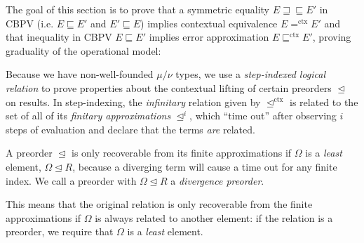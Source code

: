 \documentclass[acmsmall,screen,12pt]{acmart}
\newif\ifshort
\newcommand{\pipe}{\,\,|\,\,}
\newcommand{\ltdyn}{\sqsubseteq}
\newcommand{\gtdyn}{\sqsupseteq}
\newcommand{\equidyn}{\mathrel{\gtdyn\ltdyn}}
\newcommand{\apreorder}{\trianglelefteq}
\newcommand{\ctxize}[1]{\mathrel{{#1}^{\text{ctx}}}}
\newcommand{\ix}[2]{\mathrel{#1^{#2}}}
\newcommand{\diverge}{\Omega}
\begin{document}
{The goal of this section is to prove that a symmetric equality $E \equidyn
E'$ in CBPV (i.e. $E \ltdyn E'$ and $E' \ltdyn E$) implies contextual
equivalence $E \ctxize= E'$ and that inequality in CBPV $E \ltdyn E'$
implies error approximation $E \ctxize\ltdyn E'$, proving graduality of the operational model\ifshort .\else :\fi
\begin{longonly}
\begin{small}
\end{small}
\end{longonly}
Because we have non-well-founded $\mu/\nu$ types, we use a
\emph{step-indexed logical relation} to prove properties about the
contextual lifting of certain preorders $\apreorder$ on results.
%
In step-indexing, the \emph{infinitary} relation given by
$\ctxize\apreorder$ is related to the set of all of its \emph{finitary
  approximations} $\ix\apreorder i$, which ``time out'' after observing
$i$ steps of evaluation and declare that the
terms \emph{are} related.
%
\begin{shortonly}
  A preorder $\apreorder$ is only recoverable from its finite
  approximations if $\diverge$ is a \emph{least} element, $\diverge
  \apreorder R$, because a diverging term will cause a time out for
  any finite index. We call a preorder with $\diverge \apreorder R$ a
  \emph{divergence preorder}.~
\end{shortonly}
%
\begin{longonly}
This means that the original relation is only recoverable from the
finite approximations if $\diverge$ is always related to another
element: if the relation is a preorder, we require that $\diverge$ is
a \emph{least} element.


\end{longonly}}
\end{document}

